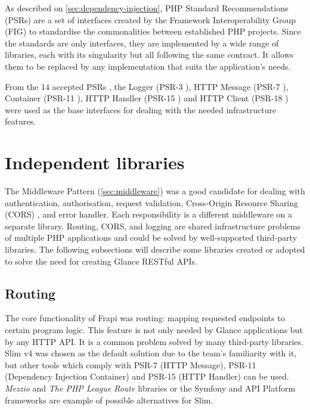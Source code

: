 As described on \autoref{sec:dependency-injection}, PHP Standard Recommendations (PSRs) are a set of interfaces created by the Framework Interoperability Group (FIG) \cite{fig-website} to standardise the commonalities between established PHP projects. Since the standards are only interfaces, they are implemented by a wide range of libraries, each with its singularity but all following the same contract. It allows them to be replaced by any implementation that suits the application's needs.

From the 14 accepted PSRs \cite{fig-website-psrs}, the Logger (PSR-3 \cite{psr-3}), HTTP Message (PSR-7 \cite{psr-7}), Container (PSR-11 \cite{psr-11}), HTTP Handler (PSR-15 \cite{psr-15}) and HTTP Client (PSR-18 \cite{psr-18}) were used as the base interfaces for dealing with the needed infrastructure features.

\section{Independent libraries}
\label{sec:independent-libs}

The Middleware Pattern (\autoref{sec:middleware}) was a good candidate for dealing with authentication, authorisation, request validation, Cross-Origin Resource Sharing (CORS) \cite{cors}, and error handler. Each responsibility is a different middleware on a separate library. Routing, CORS, and logging are shared infrastructure problems of multiple PHP applications and could be solved by well-supported third-party libraries. The following subsections will describe some libraries created or adopted to solve the need for creating Glance RESTful APIs.

\subsection{Routing}

The core functionality of Frapi was routing: mapping requested endpoints to certain program logic. This feature is not only needed by Glance applications but by any HTTP API. It is a common problem solved by many third-party libraries. Slim v4 \cite{slim-v4} was chosen as the default solution due to the team's familiarity with it, but other tools which comply with PSR-7 (HTTP Message), PSR-11 (Dependency Injection Container) and PSR-15 (HTTP Handler) can be used. \textit{Mezzio} \cite{mezzio-website} and \textit{The PHP League Route} \cite{php-league-route} libraries or the Symfony \cite{symfony-website} and API Platform \cite{api-platform-website} frameworks are example of possible alternatives for Slim.

